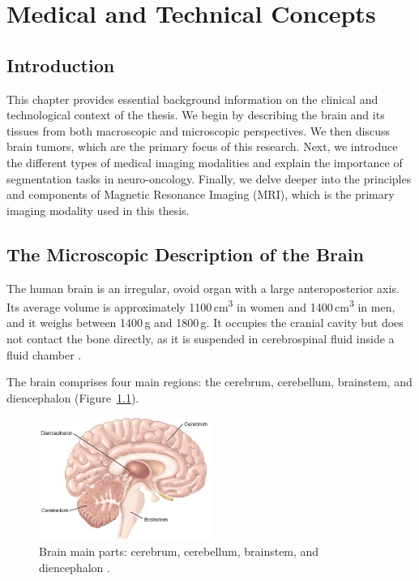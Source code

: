 \chapter{Medical and Technical Concepts}

\section{Introduction}
This chapter provides essential background information on the clinical and technological context of the thesis. We begin by describing the brain and its tissues from both macroscopic and microscopic perspectives. We then discuss brain tumors, which are the primary focus of this research. Next, we introduce the different types of medical imaging modalities and explain the importance of segmentation tasks in neuro-oncology. Finally, we delve deeper into the principles and components of Magnetic Resonance Imaging (MRI), which is the primary imaging modality used in this thesis.

\section{The Microscopic Description of the Brain}

The human brain is an irregular, ovoid organ with a large anteroposterior axis. Its average volume is approximately 1100\,cm\textsuperscript{3} in women and 1400\,cm\textsuperscript{3} in men, and it weighs between 1400\,g and 1800\,g. It occupies the cranial cavity but does not contact the bone directly, as it is suspended in cerebrospinal fluid inside a fluid chamber \cite{ref3}.

The brain comprises four main regions: the cerebrum, cerebellum, brainstem, and diencephalon (Figure~\ref{fig:brain-regions}).

\begin{figure}[ht]
      \centering
      \includegraphics[width=0.5\textwidth]{Images/Chapter0/brain.jpg}
      \caption{Brain main parts: cerebrum, cerebellum, brainstem, and diencephalon \cite{freudenrich2013visualizing}.}
      \label{fig:brain-regions}
\end{figure}

